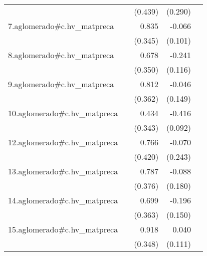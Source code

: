 {\begin{longtable}{l*{4}{D{.}{.}{-1}}}
            &                     &     (0.439)         &     (0.290)         &                     \\
\addlinespace
7.aglomerado#c.hv\_matpreca&                     &       0.835\sym{*}  &      -0.066         &                     \\
            &                     &     (0.345)         &     (0.101)         &                     \\
\addlinespace
8.aglomerado#c.hv\_matpreca&                     &       0.678         &      -0.241\sym{*}  &                     \\
            &                     &     (0.350)         &     (0.116)         &                     \\
\addlinespace
9.aglomerado#c.hv\_matpreca&                     &       0.812\sym{*}  &      -0.046         &                     \\
            &                     &     (0.362)         &     (0.149)         &                     \\
\addlinespace
10.aglomerado#c.hv\_matpreca&                     &       0.434         &      -0.416\sym{***}&                     \\
            &                     &     (0.343)         &     (0.092)         &                     \\
\addlinespace
12.aglomerado#c.hv\_matpreca&                     &       0.766         &      -0.070         &                     \\
            &                     &     (0.420)         &     (0.243)         &                     \\
\addlinespace
13.aglomerado#c.hv\_matpreca&                     &       0.787\sym{*}  &      -0.088         &                     \\
            &                     &     (0.376)         &     (0.180)         &                     \\
\addlinespace
14.aglomerado#c.hv\_matpreca&                     &       0.699         &      -0.196         &                     \\
            &                     &     (0.363)         &     (0.150)         &                     \\
\addlinespace
15.aglomerado#c.hv\_matpreca&                     &       0.918\sym{**} &       0.040         &                     \\
            &                     &     (0.348)         &     (0.111)         &                     \\

\end{longtable}}
